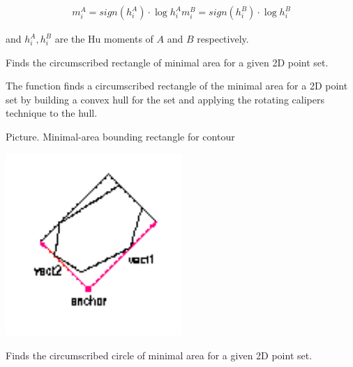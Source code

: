 \[
\begin{array}{l}
m^A_i = sign(h^A_i) \cdot \log{h^A_i}
m^B_i = sign(h^B_i) \cdot \log{h^B_i}
\end{array}
\]

and $h^A_i, h^B_i$ are the Hu moments of $A$ and $B$ respectively.


Finds the circumscribed rectangle of minimal area for a given 2D point set.


\begin{description}
\end{description}

The function finds a circumscribed rectangle of the minimal area for a 2D point set by building a convex hull for the set and applying the rotating calipers technique to the hull.

Picture. Minimal-area bounding rectangle for contour

\includegraphics[width=0.5\textwidth]{pics/minareabox.png}

Finds the circumscribed circle of minimal area for a given 2D point set.


\begin{description}
\end{description}

